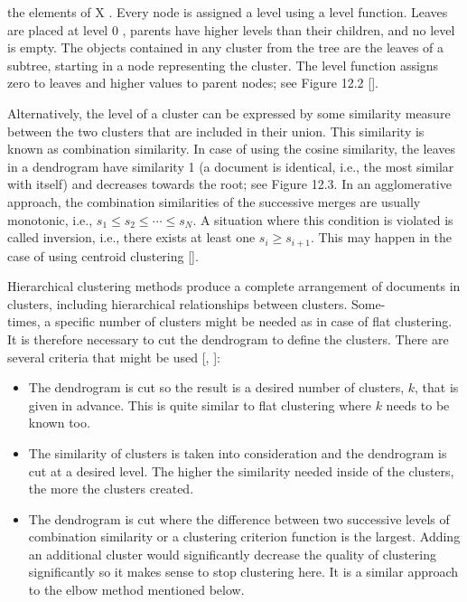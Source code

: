 the elements of X . Every node is assigned a level using a level function. Leaves are placed at level 0 , parents have higher levels than their children, and no level is empty. The objects contained in any cluster from the tree are the leaves of a subtree, starting in a node representing the cluster. The level function assigns zero to leaves and higher values to parent nodes; see Figure 12.2 [\cite{ref3}].

Alternatively, the level of a cluster can be expressed by some similarity measure between the two clusters that are included in their union. This similarity is known as combination similarity. In case of using the cosine similarity, the leaves in a dendrogram have similarity 1 (a document is identical, i.e., the most similar with itself) and decreases towards the root; see Figure 12.3. In an agglomerative approach, the combination similarities of the successive merges are usually monotonic, i.e., $s_{1} \leq s_{2} \leq \cdots \leq s_{N}$. A situation where this condition is violated is called inversion, i.e., there exists at least one $s_{i} \geq s_{i+1}$. This may happen in the case of using centroid clustering [\cite{ref185}].

Hierarchical clustering methods produce a complete arrangement of documents in clusters, including hierarchical relationships between clusters. Some-\\[0pt]
times, a specific number of clusters might be needed as in case of flat clustering. It is therefore necessary to cut the dendrogram to define the clusters. There are several criteria that might be used [\cite{ref185}, \cite{ref292}]:

\begin{itemize}
  \item The dendrogram is cut so the result is a desired number of clusters, $k$, that is given in advance. This is quite similar to flat clustering where $k$ needs to be known too.
  \item The similarity of clusters is taken into consideration and the dendrogram is cut at a desired level. The higher the similarity needed inside of the clusters, the more the clusters created.
  \item The dendrogram is cut where the difference between two successive levels of combination similarity or a clustering criterion function is the largest. Adding an additional cluster would significantly decrease the quality of clustering significantly so it makes sense to stop clustering here. It is a similar approach to the elbow method mentioned below.
\end{itemize}

